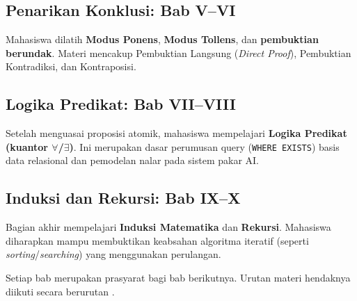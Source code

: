 \subsection{Penarikan Konklusi: Bab V--VI}
Mahasiswa dilatih \textbf{Modus Ponens}, \textbf{Modus Tollens}, dan \textbf{pembuktian berundak}. Materi mencakup Pembuktian Langsung (\textit{Direct Proof}), Pembuktian Kontradiksi, dan Kontraposisi.

\subsection{Logika Predikat: Bab VII--VIII}
Setelah menguasai proposisi atomik, mahasiswa mempelajari \textbf{Logika Predikat (kuantor $\forall$/$\exists$)}. Ini merupakan dasar perumusan query (\texttt{WHERE EXISTS}) basis data relasional dan pemodelan nalar pada sistem pakar AI.

\subsection{Induksi dan Rekursi: Bab IX--X}
Bagian akhir mempelajari \textbf{Induksi Matematika} dan \textbf{Rekursi}. Mahasiswa diharapkan mampu membuktikan keabsahan algoritma iteratif (seperti \textit{sorting}/\textit{searching}) yang menggunakan perulangan.

Setiap bab merupakan prasyarat bagi bab berikutnya. Urutan materi hendaknya diikuti secara berurutan \cite{levin_discrete,rosen2019}.
